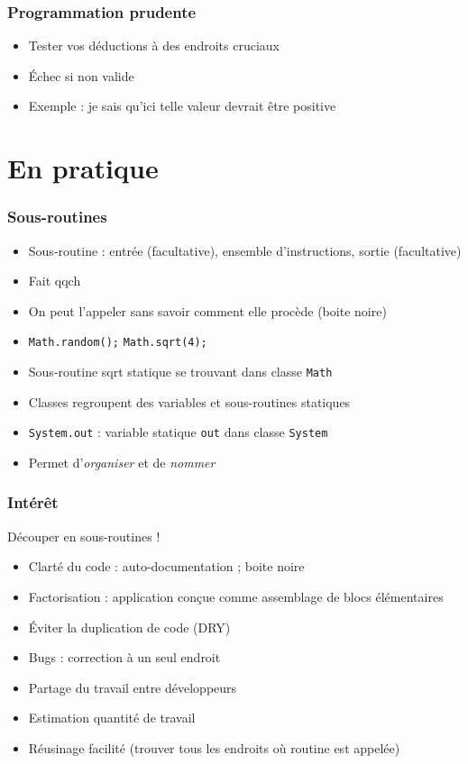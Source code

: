 \documentclass[english, french]{beamer}
\begin{document}
\begin{frame}
	\frametitle{Programmation prudente}
	\begin{itemize}
		\item Tester vos déductions à des endroits cruciaux 
		\item Échec si non valide
		\item Exemple : je sais qu’ici telle valeur devrait être positive
	\end{itemize}
\end{frame}

\section{En pratique}
\begin{frame}
	\frametitle{Sous-routines}
	\begin{itemize}
		\item Sous-routine : entrée (facultative), ensemble d’instructions, sortie (facultative)
		\item Fait qqch
		\item On peut l’appeler sans savoir comment elle procède (boite noire)
		\item \texttt{Math.random();} \texttt{Math.sqrt(4);}
		\item Sous-routine sqrt statique se trouvant dans classe \texttt{Math}
		\item Classes regroupent des variables et sous-routines statiques
		\item \texttt{System.out} : variable statique \texttt{out} dans classe \texttt{System}
		\item Permet d’\emph{organiser} et de \emph{nommer}
	\end{itemize}
\end{frame}

\begin{frame}
	\frametitle{Intérêt}
	Découper en sous-routines !
	\begin{itemize}
		\item Clarté du code : auto-documentation ; boite noire
		\item Factorisation : application conçue comme assemblage de blocs élémentaires
		\item Éviter la duplication de code (DRY)
		\item Bugs : correction à un seul endroit
		\item Partage du travail entre développeurs
		\item Estimation quantité de travail
		\item Réusinage facilité (trouver tous les endroits où routine est appelée)
	\end{itemize}
\end{frame}
\end{document}

